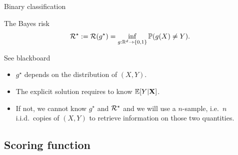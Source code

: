 \documentclass[xcolor={usenames,dvipsnames},handout]{beamer}
\begin{document}
\begin{frame}{Binary classification}


\begin{block}{The Bayes risk}
$$
{\mathcal{R}}^\star := {\mathcal{R}}(g^\star) = \inf_{g :  \mathbb{R}^d \to \{0,1\}}   \mathbb{P} (g(X) \neq Y).
$$
\end{block}

\vspace{.2cm}

\centering
{\color{Vert} See blackboard}


\vspace{.2cm}

 \begin{itemize}
 \item \alert{$g^\star$ depends on the distribution of $(X,Y)$}. 
\item The explicit solution requires to \alert{know $\mathbb{E}[Y|\textbf{X}]$}.
 \item If not, we cannot know $g^\star$ and ${\mathcal{R}}^\star$ and we will use a $n$-sample, i.e.\ $n$ i.i.d.\ copies of $(X,Y)$ to retrieve information on those two quantities.
 \end{itemize}


\end{frame}


\subsection{Scoring function}
\end{document}
